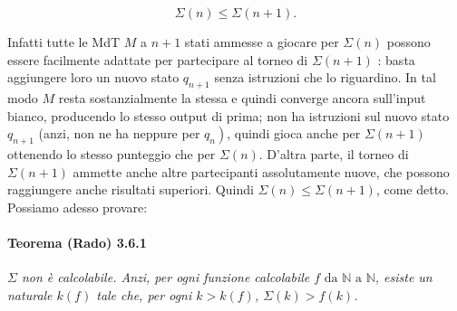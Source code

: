 \[
    \Sigma(n) \leq \Sigma(n+1) .
\]

Infatti tutte le MdT $M$ a $n+1$ stati ammesse a giocare per $\Sigma(n)$
possono essere facilmente adattate per partecipare al torneo di
$\Sigma(n+1)$ : basta aggiungere loro un nuovo stato $q_{n+1}$ senza
istruzioni che lo riguardino. In tal modo $M$ resta sostanzialmente la
stessa e quindi converge ancora sull'input bianco, producendo lo stesso
output di prima; non ha istruzioni sul nuovo stato $q_{n+1}$ (anzi, non ne
ha neppure per $\left.q_n\right)$, quindi gioca anche per $\Sigma(n+1)$
ottenendo lo stesso punteggio che per $\Sigma(n)$. D'altra parte, il torneo
di $\Sigma(n+1)$ ammette anche altre partecipanti assolutamente nuove, che
possono raggiungere anche risultati superiori. Quindi $\Sigma(n) \leq
    \Sigma(n+1)$, come detto.\\
Possiamo adesso provare:

\paragraph{Teorema (Rado) 3.6.1}
\textit{$\Sigma$ non è calcolabile. Anzi, per ogni funzione calcolabile
    $f \text{ da } \mathbb{N} \text{ a } \mathbb{N}$, esiste un naturale $k(f)$ tale che, per ogni
    $k>k(f)$, $\Sigma(k)>f(k)$.}

